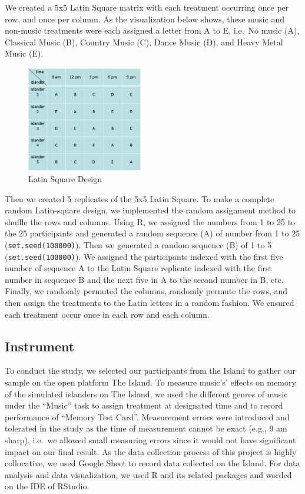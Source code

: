 \documentclass[]{article}
\begin{document}
We created a 5x5 Latin Square matrix with each treatment occurring once
per row, and once per column. As the visualization below shows, these
music and non-music treatments were each assigned a letter from A to E,
i.e.~No music (A), Classical Music (B), Country Music (C), Dance Music
(D), and Heavy Metal Music (E).

\begin{figure}
\centering
\includegraphics[width=0.45000\textwidth]{Square.png}
\caption{Latin Square Design}
\end{figure}

Then we created 5 replicates of the 5x5 Latin Square. To make a complete
random Latin-square design, we implemented the random assignment method
to shuffle the rows and columns. Using R, we assigned the numbers from 1
to 25 to the 25 participants and generated a random sequence (A) of
number from 1 to 25 (\texttt{set.seed(100000)}). Then we generated a
random sequence (B) of 1 to 5 (\texttt{set.seed(100000)}). We assigned
the participants indexed with the first five number of sequence A to the
Latin Square replicate indexed with the first number in sequence B and
the next five in A to the second number in B, etc. Finally, we randomly
permuted the columns, randomly permute the rows, and then assign the
treatments to the Latin letters in a random fashion. We ensured each
treatment occur once in each row and each column.

\subsection{Instrument}\label{instrument}

To conduct the study, we selected our participants from the Island to
gather our sample on the open platform The Island. To measure music's'
effects on memory of the simulated islanders on The Island, we used the
different genres of music under the ``Music'' task to assign treatment
at designated time and to record performance of ``Memory Test Card''.
Measurement errors were introduced and tolerated in the study as the
time of measurement cannot be exact (e.g., 9 am sharp), i.e.~we allowed
small measuring errors since it would not have significant impact on our
final result. As the data collection process of this project is highly
collocative, we used Google Sheet to record data collected on the
Island. For data analysis and data visualization, we used R and its
related packages and worded on the IDE of RStudio.
\end{document}
